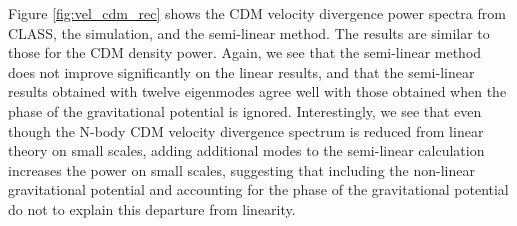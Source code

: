 \documentclass[twocolumn,superscriptaddress,prd]{revtex4}
\begin{document}
Figure \ref{fig:vel_cdm_rec} shows the CDM
velocity divergence power spectra from CLASS, the simulation,
and the semi-linear method.  The results are similar to those for the
CDM density power.   Again, we see that
the semi-linear method does not improve significantly on the linear
results, and that the semi-linear results obtained with twelve eigenmodes
agree well with those obtained when the phase of the
gravitational potential is ignored. Interestingly, we see that even
though the N-body CDM velocity divergence spectrum is reduced
from linear theory on small scales, adding additional modes to the
semi-linear calculation increases the power on small scales, suggesting that
including 
the non-linear gravitational potential and accounting for the phase of
the gravitational potential do not to explain this departure
from linearity.
\end{document}
